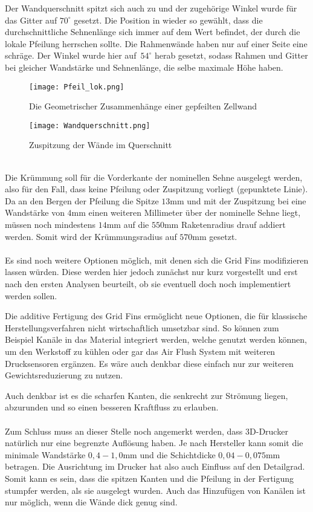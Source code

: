 Der Wandquerschnitt spitzt sich auch zu und der zugehörige Winkel wurde für das Gitter auf $70^\circ$ gesetzt. Die Position in wieder so gewählt, dass die durchschnittliche Sehnenlänge sich immer auf dem Wert befindet, der durch die lokale Pfeilung herrschen sollte. Die Rahmenwände haben nur auf einer Seite eine schräge. Der Winkel wurde hier auf\ $54^\circ$ herab gesetzt, sodass Rahmen und Gitter bei gleicher Wandstärke und Sehnenlänge, die selbe maximale Höhe haben.
\begin{figure}[h]
	\begin{minipage}[t]{0.45\linewidth}
		\centering
		\texttt{[image: Pfeil\_lok.png]}
		\caption{Die Geometrischer Zusammenhänge einer gepfeilten Zellwand}
	\end{minipage}
	\hfill
	\begin{minipage}[t]{0.45\linewidth}
		\centering
		\texttt{[image: Wandquerschnitt.png]}
		\caption{Zuspitzung der Wände im Querschnitt}
	\end{minipage}
\end{figure}\\
Die Krümmung soll für die Vorderkante der nominellen Sehne ausgelegt werden, also für den Fall, dass keine Pfeilung oder Zuspitzung vorliegt (gepunktete Linie). Da an den Bergen der Pfeilung die Spitze $13$mm und mit der Zuspitzung bei eine Wandstärke von $4$mm einen weiteren Millimeter über der nominelle Sehne liegt, müssen noch mindestens $14$mm auf die $550$mm Raketenradius drauf addiert werden. Somit wird der Krümmungsradius auf $570$mm gesetzt.
\\~\\
Es sind noch weitere Optionen möglich, mit denen sich die Grid Fins modifizieren lassen würden. Diese werden hier jedoch zunächst nur kurz vorgestellt und erst nach den ersten Analysen beurteilt, ob sie eventuell doch noch implementiert werden sollen.

Die additive Fertigung des Grid Fins ermöglicht neue Optionen, die für klassische Herstellungsverfahren nicht wirtschaftlich umsetzbar sind. So können zum Beispiel Kanäle in das Material integriert werden, welche genutzt werden können, um den Werkstoff zu kühlen oder gar das Air Flush System mit weiteren Drucksensoren ergänzen. Es wäre auch denkbar diese einfach nur zur weiteren Gewichtsreduzierung zu nutzen.

Auch denkbar ist es die scharfen Kanten, die senkrecht zur Strömung liegen, abzurunden und so einen besseren Kraftfluss zu erlauben.
\\~\\
Zum Schluss muss an dieser Stelle noch angemerkt werden, dass 3D-Drucker natürlich nur eine begrenzte Auflösung haben. Je nach Hersteller kann somit die minimale Wandstärke $0,4-1,0$mm \cite{eos, preise} und die Schichtdicke $0,04-0,075$mm \cite{preise} betragen. Die Ausrichtung im Drucker hat also auch Einfluss auf den Detailgrad. Somit kann es sein, dass die spitzen Kanten und die Pfeilung in der Fertigung stumpfer werden, als sie ausgelegt wurden. Auch das Hinzufügen von Kanälen ist nur möglich, wenn die Wände dick genug sind.
